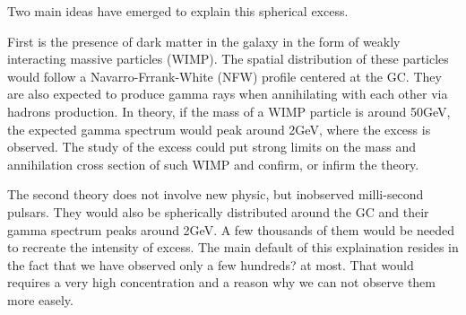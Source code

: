 Two main ideas have emerged to explain this spherical excess.

First is the presence of dark matter in the galaxy in the form of weakly interacting massive particles (WIMP). The spatial distribution of these particles would follow a Navarro-Frrank-White (NFW) profile centered at the GC. They are also expected to produce gamma rays when annihilating with each other via hadrons production. In theory, if the mass of a WIMP particle is around 50GeV, the expected gamma spectrum would peak around 2GeV, where the excess is observed. 
The study of the excess could put strong limits on the mass and annihilation cross section of such WIMP and confirm, or infirm the theory.

The second theory does not involve new physic, but inobserved milli-second pulsars. They would also be spherically distributed around the GC and their gamma spectrum peaks around 2GeV. A few thousands of them would be needed to recreate the intensity of excess. The main default of this explaination resides in the fact that we have observed only a few hundreds? at most. That would requires a very high concentration and a reason why we can not observe them more easely.







































